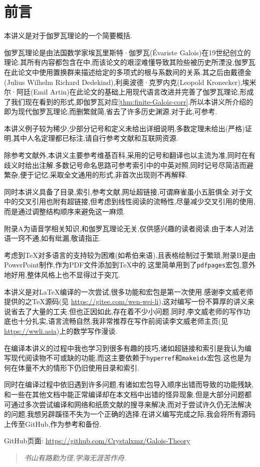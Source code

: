 \chapter{前言}
本讲义是对于伽罗瓦理论的一个简要概括.

伽罗瓦理论是由法国数学家埃瓦里斯特·伽罗瓦(Évariste Galois)在19世纪创立的理论.其所有内容都包含在\cite{Galois}中,而该论文的艰涩难懂导致其险些被历史所湮没,伽罗瓦在此论文中使用置换群来描述给定的多项式的根与系数间的关系.其之后由戴德金(Julius Wilhelm Richard Dedekind),利奥波德·克罗内克(Leopold Kronecker),埃米尔·阿廷(Emil Artin)在此论文的基础上用现代语言改进并完善了伽罗瓦理论,形成了我们现在看到的形式,即伽罗瓦对应\ref{thm:finite-Galois-corr}.所以本讲义所介绍的即为现代伽罗瓦理论,而删繁就简,省去了许多历史渊源.对于此,可参考\cite{Artin}\cite{YH}.

本讲义例子较为稀少,少部分记号和定义未给出详细说明,多数定理未给出(严格)证明,其中人名定理都已标注,请自行参考文献和互联网资源.

除参考文献外,本讲义主要参考维基百科,采用的记号和翻译也以主流为准,同时在有歧义时给出注解.多数记号命名思路可参考索引中的中英对照,同时记号尽简洁而避繁杂,便于记忆,采取全文通用的形式,非首次出现则不再解释.

同时本讲义具备了目录,索引,参考文献,网址超链接,可谓麻雀虽小五脏俱全.对于文中的交叉引用也附有超链接,但考虑到线性阅读的流畅性,尽量减少交叉引用的使用,而是通过调整结构顺序来避免这一麻烦.

附录A为语音学相关知识,和伽罗瓦理论无关,仅供感兴趣的读者阅读.由于本人对法语一窍不通,如有纰漏,敬请指正.

考虑到\TeX 对多语言的支持较为困难(如希伯来语),且表格绘制过于繁琐,附录B是由PowerPoint制作,作为PDF文件添加到\TeX 中的.这里简单用到了\texttt{pdfpages}宏包,意外地好用,整体风格上也不显得过于突兀.

本讲义是对\LaTeX 编译的一次尝试,很多功能和宏包是第一次使用.感谢李文威老师提供的\cite{LW}之\TeX 源码(见 \url{https://gitee.com/wen-wei-li}),这对编写一份不算厚的讲义来说省去了大量的工夫.但也正因如此,存在着不少小问题.同时,李文威老师的写作功底也十分扎实,语言流畅自然,我非常推荐在写作前阅读李文威老师主页(见\url{https://wwli.asia})上的数学写作漫谈.

在编译本讲义的过程中我也学习到很多有趣的技巧,诸如超链接和索引是我认为编写现代阅读物不可或缺的功能,而这主要依赖于\texttt{hyperref}和\texttt{makeidx}宏包.这也是为何在体量不大的情形下仍旧使用目录和索引.

同时在编译过程中依旧遇到许多问题,有诸如宏包导入顺序出错而导致的功能残缺,和一些在其他文档中能正常编译却在本文档中出错的怪异现象.但是大部分问题都可通过多次尝试编译和网络和纸质文献的搜寻来解决,而对于尝试许久仍无法解决的问题,我想另辟蹊径不失为一个正确的选择.在讲义编写完成之际,我会将所有源码上传至GitHub,作为参考和备份.

GitHub页面: \url{https://github.com/Crystalxmz/Galois-Theory}

\begin{quotation}
	\textit{书山有路勤为径,学海无涯苦作舟.}
\end{quotation}


